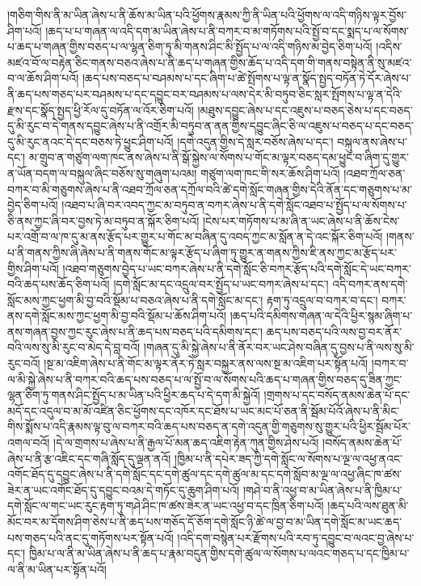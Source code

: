 །གཅིག་གིས་ནི་མ་ཡིན་ཞེས་པ་ནི་ཆོས་མ་ཡིན་པའི་ཕྱོགས་རྣམས་ཀྱི་ནི་ཡིན་པའི་ཕྱོགས་ལ་འདི་གཉིས་ལྟར་བྱོས་ཤིག་པའོ། །ཆད་པ་པ་གཞན་ལ་འདི་དག་མ་ཡིན་ཞེས་པ་ནི་བཀར་བ་མ་གཏོགས་པའི་སྤྱོ་བ་དང་སྨད་པ་ལ་སོགས་པ་ཆད་པ་གཞན་གྱིས་བཅད་པ་ལ་ལྷན་ཅིག་ཏུ་མི་གནས་ཤིང་མི་སྤྱོད་པ་ལ་འདི་གཉིས་མ་བྱེད་ཅིག་པའོ། །འདིས་མཛའ་བོ་ལ་བརྟེན་ཅིང་གནས་བཅའ་ཞེས་པ་ནི་ཆད་པ་གཞན་གྱིས་ཆོད་པ་འདི་དག་གི་གནས་བསྟེན་ནི་སུ་མཛའ་བ་ལ་ཆོས་ཤིག་པའོ། །ཆད་པས་བཅད་པ་བཤམས་པ་དང་ཞིག་པ་ཚེ་སྤོགས་པ་ལྟ་ན་སྣོད་སྤྱད་བཏོན་ཏེ་དོར་ཞེས་པ་ནི་ཆད་པས་གཅད་པར་བཤམས་པ་དང་དབྱུང་བར་བཤམས་པ་ལས་དེར་མི་བཏུབ་ཅིང་སླར་སྤོགས་པ་ལྟ་ན་དེའི་རྫས་དང་སྣོད་སྤྱད་ཕྱི་རོལ་དུ་བཏོན་ལ་འོར་ཅིག་པའོ། །མཐུས་དབྱུང་ཞེས་པ་དང་འཇུས་པ་བཅད་ཅེས་པ་དང་བཅད་དུ་མི་རུང་བ་དེ་གནས་དབྱུང་ཞེས་པ་ནི་འགྲོར་མི་བཏུབ་ན་ནན་གྱིས་དབྱུང་ཞིང་ཅི་ལ་འཇུས་པ་བཅད་པ་དང་བཅད་དུ་མི་རུང་ནའང་དེ་དང་བཅས་ཏེ་ཕྱུང་ཤིག་པའོ། །དགེ་འདུན་གྱིས་དེ་སླར་བཅོས་ཞེས་པ་དང་། བསྐུལ་ནས་ཞེས་པ་དང་། མ་གྲུབ་ན་གཙུག་ལག་ཁང་ནས་ཞེས་པ་ནི་སྒོ་སྐྱེས་ལ་སོགས་པ་གོང་མ་ལྟར་བཅད་དམ་ཕྱུང་བ་ཞིག་དུ་གྱུར་ན་ཡོན་བདག་ལ་བསྐུལ་ཞིང་བཅོས་སུ་གཞུག་པའམ། གཙུག་ལག་ཁང་གི་སར་ཆོས་ཤིག་པའོ། །འཐབ་ཀྲོལ་ཅན་བཀར་བ་མི་གཅུགས་ཞེས་པ་ནི་འཐབ་ཀྲོལ་ཅན་དཀྲོལ་བའི་ཚེ་དགེ་སློང་གཞན་གྱིས་དེའི་ནོན་དང་གཅུགས་པ་མ་བྱེད་ཅིག་པའོ། །འཐབ་པ་ཞི་བར་འབད་ཀྱང་མ་བཏུབ་ན་བཀར་ཞེས་པ་ནི་དགེ་སློང་འཐབ་པ་སྤྱོད་པ་ལ་སོགས་པ་ཅི་ནས་ཀྱང་ཞི་བར་བྱས་ཏེ་མ་བཏུབ་ན་སྐོར་ཅིག་པའོ། །ངེས་པར་གཏོགས་པ་མ་ཞི་ན་ཡང་ཞེས་པ་ནི་ཆོས་ངེས་པར་འགྲོ་བ་ལ་ཁ་དུ་མ་ནས་རྩོད་པར་གྱུར་པ་གོང་མ་བཞིན་དུ་འབད་ཀྱང་མ་སློན་ན་དེ་འང་སྐོར་ཅིག་པའོ། །གནས་པ་ནི་གནས་ཀྱིས་ཞི་ཞེས་པ་ནི་གནས་གོང་མ་ལྟར་རྩོད་པ་ཞིག་ཏུ་གྱུར་ན་གནས་ཀྱིས་ཇི་ནས་ཀྱང་མ་རྩོད་པར་གྱིས་ཤིག་པའོ། །འཐབ་གཅུགས་བྱེད་པ་ཡང་བཀར་ཞེས་པ་ནི་དགེ་སློང་ཅི་བཀར་རྩོད་པའི་དགེ་སློང་དེ་ཡང་བཀར་བའི་ཆད་པས་ཆོད་ཅིག་པའོ། །དགེ་སློང་མ་དང་འདྲུལ་བར་སྤྱོད་པ་ཡང་བཀར་ཞེས་པ་དང་། འདི་བཀར་ནས་དགེ་སློང་མས་ཀྱང་ཕྱག་མི་བྱ་བའི་སྡོམ་པ་བཅའ་ཞེས་པ་ནི་དགེ་སློང་མ་དང་། རྟག་ཏུ་འདྲུལ་བ་བཀར་བ་དང་། བཀར་ནས་དགེ་སློང་མས་ཀྱང་ཕྱག་མི་བྱ་བའི་སྡོམ་པ་ཆོས་ཤིག་པའོ། །ཆད་པའི་དམིགས་གཞན་ལ་དེའི་ཕྱིར་སྙམ་ཞིག་པ་ནས་གཞན་བྱས་ཀྱང་རུང་ཞེས་པ་ནི་ཆད་པས་བཅད་པའི་དམིགས་དང་། ཆད་པས་བཅད་པའི་ལས་བྱ་བར་ནོར་བའི་ལས་སུ་མི་རུང་བ་མེད་དེ་བླ་བའོ། །གཞན་དུ་མི་སྐྱེ་ཞེས་པ་ནི་ནོར་བར་ཡང་ཤེས་བཞིན་དུ་བྱས་པ་ནི་ལས་སུ་མི་རུང་བའོ། །སྔ་མ་འཇིག་ཞེས་པ་ནི་གོང་མ་ལྟར་ནོར་ཏེ་སླར་བསྐྱར་ནས་ལས་སྔ་མ་འཇིག་པར་སྟོན་པའོ། །བཀར་བ་ལ་མི་སྐྱེ་ཞེས་པ་ནི་བཀར་བའི་ཆད་པས་བཅད་པ་ལ་སྤྱོ་བ་ལ་སོགས་པའི་ཆད་པ་གཞན་གྱིས་བཅད་དུ་ཟིན་ཀྱང་ལྷན་ཅིག་ཏུ་གནས་ཤིང་སྤྱོད་པ་མ་ཡིན་པའི་ཕྱིར་ཆད་པ་དེ་དག་མི་སྐྱེའོ། །གྲགས་པ་དང་བསོད་ནམས་ཆེན་པོ་དང་མདོ་དང་འདུལ་བ་མ་མོ་འཛིན་ཅིང་ཕྱོགས་དང་འཁོར་དང་ཐོས་པ་ཡང་མང་པོ་ཅན་ནི་སྦོམ་པོའོ་ཞེས་པ་ནི་མིང་གིས་སྨོས་པ་འདི་རྣམས་ལྟ་བུ་ལ་བཀར་བའི་ཆད་པས་བཅད་ན་དགེ་འདུན་གྱི་གཅུགས་སུ་གྱུར་པའི་ཕྱིར་སྦོམ་པོར་འགལ་བའོ། །དེ་ལ་གྲགས་པ་ཞེས་པ་ནི་རྒྱལ་པོ་མན་ཆད་འཇིག་རྟེན་ཀུན་གྱིས་ཤེས་པའོ། །བསོད་ནམས་ཆེན་པོ་ཞེས་པ་ནི་རྩ་འཇིང་དང་གཞི་སློད་དུ་ལྡན་ནའོ། །ཁྱིམ་པ་ནི་དཔེར་ཟད་ཀྱི་དགེ་སློང་ལ་སོགས་པ་ལྔ་ལ་འཕྱ་ནའང་འགོང་ཐོད་དུ་དབྱུང་ཞེས་པ་ནི་དགེ་སློང་དང་དགེ་ཚུལ་དང་དགེ་ཚུལ་མ་དང་དགེ་སློབ་མ་ལྔ་ལ་འཕྱ་ཞིང་ཁ་ཚས་ཟེར་ན་ཡང་འགོང་ཐོད་དུ་དབྱུང་བའམ་དེ་གཏོང་དུ་ཆུག་ཤིག་པའོ། །གཤེ་བ་ནི་འཕྱ་བ་མ་ཡིན་ཞེས་པ་ནི་ཁྱིམ་པ་དགེ་སློང་ལ་གང་ཡང་རུང་རྟག་ཏུ་གཤེ་ཤིང་ཁ་ཚས་ཟེར་ན་ཡང་འཕྱ་བ་དང་ཁྲིན་ཅིག་པའོ། །ཆད་པའི་ལས་ཐུན་མི་མོང་བར་མ་དོགས་ཤིག་ཅེས་པ་ནི་ཆད་པས་གཅོད་དོ་ཅོག་དགེ་སློང་ཉི་ཚེ་ལ་བྱ་བ་མ་ཡིན་དགེ་སློང་མ་ཡང་ཆད་པས་གཅད་པའི་ནང་དུ་གཏོགས་པར་སྟོན་པའོ། །འདི་དག་བསྙེན་པར་རྫོགས་པའི་རབ་ཏུ་དབྱུང་བ་ལའང་བྱ་ཞེས་པ་དང་། ཁྱིམ་པ་ལ་ནི་མ་ཡིན་ཞེས་པ་ནི་ཆད་པ་རྣམ་བདུན་གྱིས་དགེ་ཚུལ་ལ་སོགས་པ་ལའང་གཅད་པ་དང་ཁྱིམ་པ་ལ་ནི་མ་ཡིན་པར་སྟོན་པའོ། 